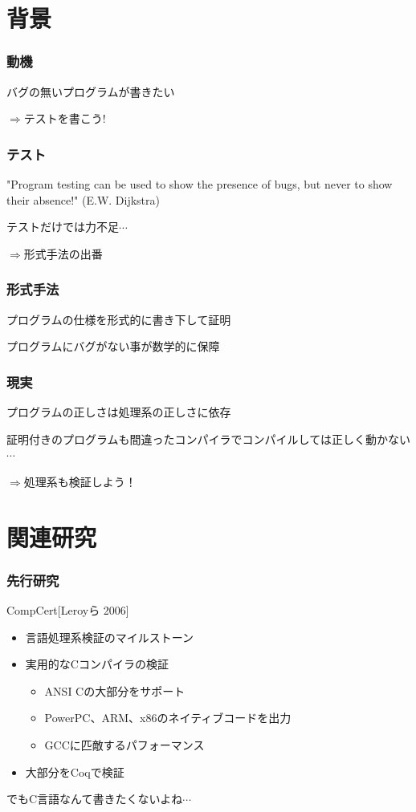 \documentclass[dvipdfmx,cjk,xcolor=dvipsnames,envcountsect,notheorems,12pt]{beamer}
\theoremstyle{definition}
\begin{document}
\section{背景}

\begin{frame}
	\frametitle{動機}
	\Large
	バグの無いプログラムが書きたい

	\vfill

	$\Rightarrow$テストを書こう!
\end{frame}

\begin{frame}
	\frametitle{テスト}
	\Large
	"Program testing can be used to show the presence of bugs, but never to show their absence!"
	(E.W. Dijkstra)

	\vfill

	テストだけでは力不足$\cdots$

	\vfill

	$\Rightarrow$形式手法の出番
\end{frame}

\begin{frame}
	\frametitle{形式手法}
	\Large
	プログラムの仕様を形式的に書き下して証明

	\vfill

	プログラムにバグがない事が数学的に保障
\end{frame}

\begin{frame}
	\frametitle{現実}
	\Large 
	プログラムの正しさは処理系の正しさに依存

	\vfill

	証明付きのプログラムも間違ったコンパイラでコンパイルしては正しく動かない$\cdots$

	\vfill

	$\Rightarrow$処理系も検証しよう！
\end{frame}

\section{関連研究}

\begin{frame}
	\frametitle{先行研究}
	\Large
	CompCert[Leroyら 2006]
	\begin{itemize}
		\item 言語処理系検証のマイルストーン
		\item 実用的なCコンパイラの検証
			\begin{itemize}
				\item ANSI Cの大部分をサポート
				\item PowerPC、ARM、x86のネイティブコードを出力
				\item GCCに匹敵するパフォーマンス
			\end{itemize}
		\item 大部分をCoqで検証
	\end{itemize}

	\vfill

	でもC言語なんて書きたくないよね$\cdots$
\end{frame}
\end{document}
